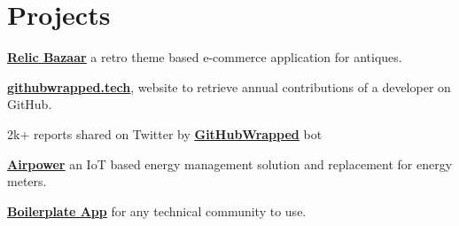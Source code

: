 \documentclass[]{deedy-resume-reversed}
\begin{document}
\begin{minipage}[t]{0.6\textwidth}
\section{Projects}
\begin{tightemize}
\item \textbf{\underline{\href{https://github.com/himanshusharma89/relic_bazaar}{Relic Bazaar}}} a retro theme based e-commerce application for antiques.
\end{tightemize}
\sectionsep

\descript{}
\begin{tightemize}
\item \textbf{\underline{\href{https://githubwrapped.tech/}{githubwrapped.tech}}}, website to retrieve annual contributions of a developer on GitHub.
\item 2k+ reports shared on Twitter by \textbf{\underline{\href{https://twitter.com/GitHubWrapped}{GitHubWrapped}}} bot
\end{tightemize}
\sectionsep

\begin{tightemize}
\item \textbf{\underline{\href{https://devfolio.co/submissions/airpower}{Airpower}}} an IoT based energy management solution and replacement for energy meters.
\end{tightemize}
\sectionsep

\begin{tightemize}
\item \textbf{\underline{\href{https://github.com/smaranjitghose/girlscript_app}{Boilerplate App}}} for any technical community to use.
\end{tightemize}
\sectionsep



\end{minipage}
\end{document}

